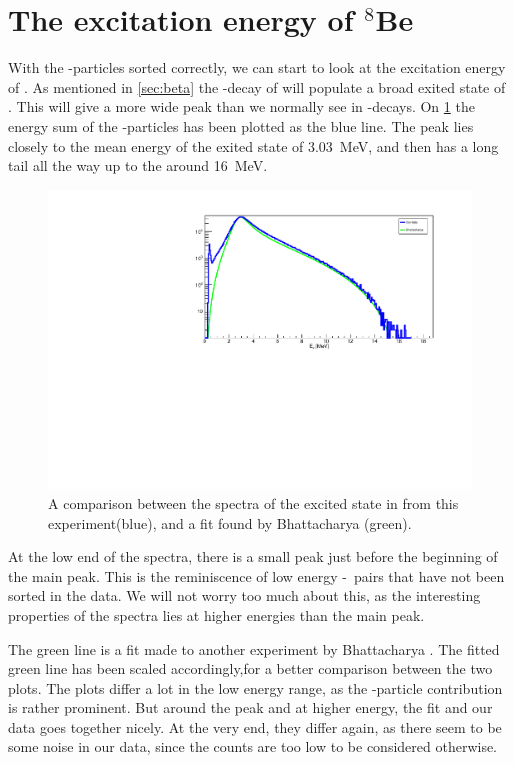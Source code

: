 \section{The excitation energy of $^8$Be}
With the \al-particles sorted correctly, we can start to look at the excitation energy of \ber. As mentioned in \cref{sec:beta} the \be-decay of \li will populate a broad exited state of \ber. This will give a more wide peak than we normally see in \al-decays. On \cref{fig:bata} the energy sum of the \al-particles has been plotted as the blue line. The peak lies closely to the mean energy of the exited state of \SI{3.03}{MeV}, and then has a long tail all the way up to the around \SI{16}{MeV}.
\begin{figure}[h]
	\centering
	\includegraphics[width=\linewidth]{../figures/bataraCompare.pdf}
	\caption{A comparison between the spectra of the excited state in \ber from this experiment(blue), and a fit found by Bhattacharya \cite{bata} (green).}
	\label{fig:bata}
\end{figure}
At the low end of the spectra, there is a small peak just before the beginning of the main peak. This is the reminiscence of low energy \be-\be\ pairs that have not been sorted in the data. We will not worry too much about this, as the interesting properties of the spectra lies at higher energies than the main peak.

The green line is a fit made to another experiment by Bhattacharya \cite{bata}. The fitted green line has been scaled accordingly,for a better comparison between the two plots. 
The plots differ a lot in the low energy range, as the \be-particle contribution is rather prominent. But around the peak and at higher energy, the fit and our data goes together nicely. At the very end, they differ again, as there seem to be some noise in our data, since the counts are too low to be considered otherwise. 

